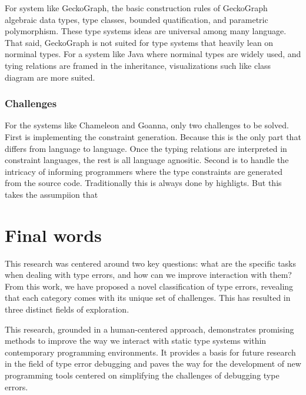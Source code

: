 For system like GeckoGraph, the basic construction rules of GeckoGraph algebraic data types, type classes, bounded quatification, and parametric polymorphism. These type systems ideas are universal among many language. That said, GeckoGraph is not suited for type systems that heavily lean on norminal types. For a system like Java where norminal types are widely used, and tying relations are framed in the inheritance, visualizations such like class diagram are more suited. 



\subsubsection{Challenges}

For the systems like Chameleon and Goanna, only two challenges to be solved. First is implementing the constraint generation. Because this is the only part that differs from language to language. Once the typing relations are interpreted in constraint languages, the rest is all language agnositic.  Second is to handle the intricacy of informing programmers where the type constraints are generated from the source code. Traditionally this is always done by highligts. But this takes the assumpiion that 


\section{Final words}

This research was centered around two key questions: what are the specific tasks when dealing with type errors, and how can we improve interaction with them? From this work, we have proposed a novel classification of type errors, revealing that each category comes with its unique set of challenges. This has resulted in three distinct fields of exploration. 

This research, grounded in a human-centered approach, demonstrates promising methods to improve the way we interact with static type systems within contemporary programming environments. It provides a basis for future research in the field of type error debugging and paves the way for the development of new programming tools centered on simplifying the challenges of debugging type errors. 
